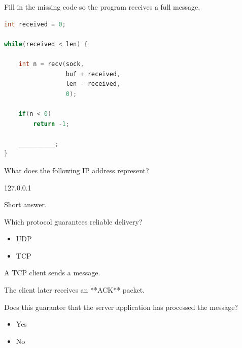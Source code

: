 \begin{questions}
	\question[10]

	Fill in the missing code so the program receives a full message.

	\begin{lstlisting}[language=C]
int received = 0;

while(received < len) {

    int n = recv(sock,
                 buf + received,
                 len - received,
                 0);

    if(n < 0)
        return -1;

    __________;
}
\end{lstlisting}

	\vspace{1cm}

	\question[8]

	What does the following IP address represent?

	\begin{center}
		127.0.0.1
	\end{center}

	Short answer.

	\vspace{2cm}

	\question[8]

	Which protocol guarantees reliable delivery?

	\begin{itemize}
		\item UDP
		\item TCP
	\end{itemize}

	\vspace{1cm}

	\question[10]

	A TCP client sends a message.

	The client later receives an **ACK** packet.

	Does this guarantee that the server application has processed the message?

	\begin{itemize}
		\item Yes
		\item No
	\end{itemize}

	\vspace{1cm}


\end{questions}
